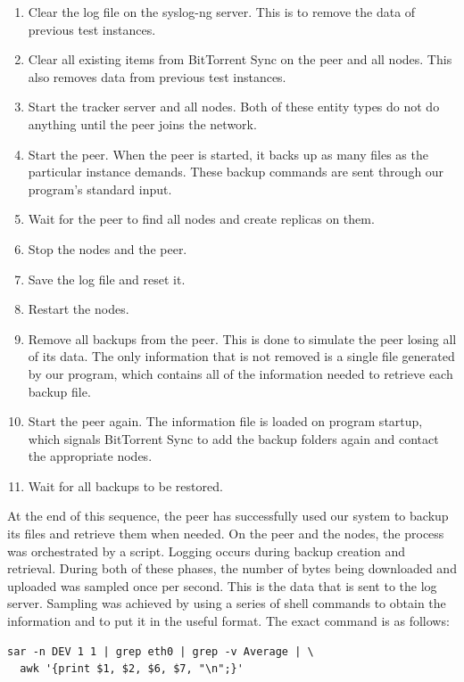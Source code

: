 \documentclass[12pt]{report}
\begin{document}
\begin{enumerate}
  \item Clear the log file on the syslog-ng server. This is to remove the data of previous test instances.
  \item Clear all existing items from BitTorrent Sync on the peer and all nodes. This also removes data from previous test instances.
  \item Start the tracker server and all nodes. Both of these entity types do not do anything until the peer joins the network.
  \item Start the peer. When the peer is started, it backs up as many files as the particular instance demands. These backup commands are sent through our program's standard input.
  \item Wait for the peer to find all nodes and create replicas on them.
  \item Stop the nodes and the peer.
  \item Save the log file and reset it.
  \item Restart the nodes.
  \item Remove all backups from the peer. This is done to simulate the peer losing all of its data. The only information that is not removed is a single file generated by our program, which contains all of the information needed to retrieve each backup file.
  \item Start the peer again. The information file is loaded on program startup, which signals BitTorrent Sync to add the backup folders again and contact the appropriate nodes.
  \item Wait for all backups to be restored.
\end{enumerate}

At the end of this sequence, the peer has successfully used our system to backup its files and retrieve them when needed. On the peer and the nodes, the process was orchestrated by a script. Logging occurs during backup creation and retrieval. During both of these phases, the number of bytes being downloaded and uploaded was sampled once per second. This is the data that is sent to the log server. Sampling was achieved by using a series of shell commands to obtain the information and to put it in the useful format. The exact command is as follows:

\begin{verbatim}
sar -n DEV 1 1 | grep eth0 | grep -v Average | \
  awk '{print $1, $2, $6, $7, "\n";}'
\end{verbatim}
\end{document}
